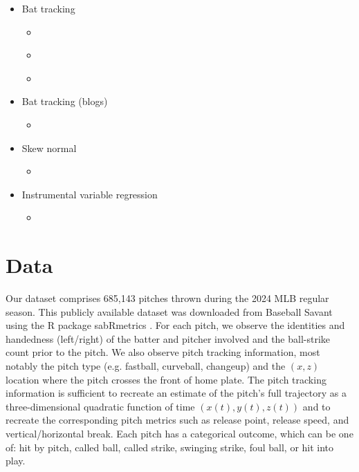\documentclass{article}
\begin{document}
      \begin{itemize}
        \item Bat tracking
        \begin{itemize}
          \item \citet{nevins_sensitivity_2019}
          \item \citet{orishimo_lower_2024}
          \item \citet{nakashima_acceptable_2025}
        \end{itemize}
        \item Bat tracking (blogs)
        \begin{itemize}
            \item 
        \end{itemize}
        \item Skew normal
        \begin{itemize}
          \item \citet{judge_exit_2024}
        \end{itemize}
        \item Instrumental variable regression
        \begin{itemize}
          \item \citet{putman_tackling_2025}
        \end{itemize}
      \end{itemize}

  \section{Data}
  \label{sec:data}

    Our dataset comprises 685,143 pitches thrown during the 2024 MLB regular season. This publicly available dataset was downloaded from Baseball Savant \citep{baseball_savant} using the R package sabRmetrics \citep{sabRmetrics}. For each pitch, we observe the identities and handedness (left/right) of the batter and pitcher involved and the ball-strike count prior to the pitch. We also observe pitch tracking information, most notably the pitch type (e.g. fastball, curveball, changeup) and the $(x, z)$ location where the pitch crosses the front of home plate. The pitch tracking information is sufficient to recreate an estimate of the pitch's full trajectory as a three-dimensional quadratic function of time $(x(t), y(t), z(t))$ and to recreate the corresponding pitch metrics such as release point, release speed, and vertical/horizontal break. Each pitch has a categorical outcome, which can be one of: hit by pitch, called ball, called strike, swinging strike, foul ball, or hit into play.
\end{document}
